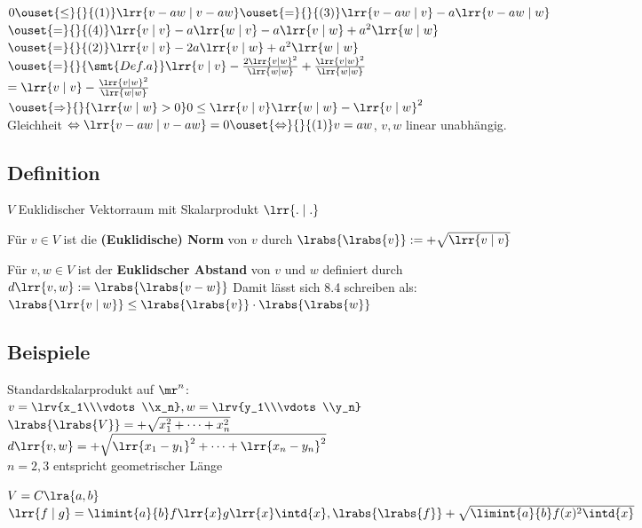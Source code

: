 	$0\ouset{\leq}{}{(1)}\lrr{v-aw\mid v-aw}\ouset{=}{}{(3)}\lrr{v-aw\mid v}-a\lrr{v-aw\mid w}$\\
	$\ouset{=}{}{(4)}\lrr{v\mid v}-a\lrr{w\mid v}-a\lrr{v\mid w}+a^2\lrr{w\mid w}$\\
	$\ouset{=}{}{(2)}\lrr{v\mid v}-2a\lrr{v\mid w}+a^2\lrr{w\mid w}$\\
	$\ouset{=}{}{\smt{Def. a}}\lrr{v\mid v}-\frac{2\lrr{v\mid w}^2}{\lrr{w\mid w}}+\frac{\lrr{v\mid w}^2}{\lrr{w\mid w}}$\\
	$=\lrr{v\mid v}-\frac{\lrr{v\mid w}^2}{\lrr{w\mid w}}$\\
	$\ouset{\Rightarrow}{}{\lrr{w\mid w}>0} 0\leq\lrr{v\mid v}\lrr{w\mid w}-\lrr{v\mid w}^2$\\
	Gleichheit $\Leftrightarrow\lrr{v-aw\mid v-aw}=0\ouset{\Leftrightarrow}{}{(1)}v=aw$, $v,w$ linear unabhängig.

\subsection{Definition}
	$V$ Euklidischer Vektorraum mit Skalarprodukt $\lrr{.\mid .}$
		\item Für $v\in V$ ist die \textbf{(Euklidische) Norm} von $v$ durch $\lrabs{\lrabs{v}}:=+\sqrt{\lrr{v\mid v}}$
		\item Für $v,w\in V$ ist der \textbf{Euklidscher Abstand} von $v$ und $w$ definiert durch\\
			$d\lrr{v,w}:=\lrabs{\lrabs{v-w}}$
	\subExEnd
	Damit lässt sich 8.4 schreiben als: $\lrabs{\lrr{v\mid w}}\leq\lrabs{\lrabs{v}}\cdot\lrabs{\lrabs{w}}$

\subsection{Beispiele}
		\item Standardskalarprodukt auf $\mr^n$:\\
			$v=\lrv{x_1\\\vdots\\x_n}, w=\lrv{y_1\\\vdots\\y_n}$\\
			$\lrabs{\lrabs{V}}=+\sqrt{x_1^2+\dots+x_n^2}$\\
			$d\lrr{v,w}=+\sqrt{\lrr{x_1-y_1}^2+\dots+\lrr{x_n-y_n}^2}$\\
			$n=2,3$ entspricht geometrischer Länge
		\item $V=C\lra{a,b}$\\
			$\lrr{f\mid g}=\limint{a}{b}f\lrr{x}g\lrr{x}\intd{x}, \lrabs{\lrabs{f}}+\sqrt{\limint{a}{b}f(x)^2\intd{x}}$
	\subExEnd

